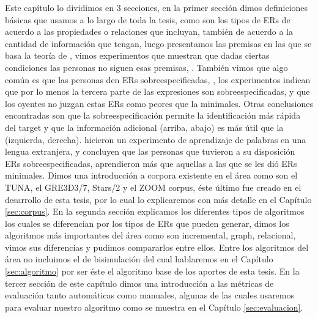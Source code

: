 Este cap\'itulo lo dividimos en 3 secciones, en la primer secci\'on dimos definiciones b\'asicas que usamos a lo largo de toda la tesis, 
como son los tipos de ERs de acuerdo a las propiedades o relaciones que incluyan, tambi\'en de acuerdo a la cantidad de informaci\'on que 
tengan, luego presentamos las premisas en las que se basa la teor\'ia de \cite{clark1992arenas,clark96,Clark-Marshall81}, vimos experimentos que muestran que dadas ciertas condiciones las personas no siguen esas premisas, 
\cite{keysar:Curr98}. Tambi\'en vimos que algo com\'un es que las personas den ERs sobreespecificadas, \cite{arts,Engelhardt_Bailey_Ferreira_2006}, los experimentos 
indican que por lo menos la tercera parte de las expresiones son sobreespecificadas, y que los oyentes no juzgan estas ERs como peores que 
la minimales. Otras conclusiones encontradas son que la sobreespecificaci\'on permite la identificaci\'on m\'as r\'apida del target y que la 
informaci\'on adicional (arriba, abajo) es m\'as \'util que la (izquierda, derecha). \cite{Lu_sasha2015} hicieron un experimento de 
aprendizaje de palabras en una lengua extranjera, y concluyen que las personas que tuvieron a su disposici\'on ERs sobreespecificadas, 
aprendieron m\'as que aquellas a las que se les di\'o ERs minimales. Dimos una introducci\'on a corpora existente en el \'area 
como son el TUNA, el GRE3D3/7, Stars/2 y el ZOOM corpus, \'este \'ultimo fue creado en el desarrollo de esta tesis, por lo cual lo explicaremos con m\'as detalle en el Cap\'itulo \ref{sec:corpus}. En la segunda secci\'on explicamos los diferentes tipos de algoritmos los cuales se 
diferencian por los tipos de ERs que pueden generar, dimos los algoritmos m\'as importantes del \'area como son incremental, graph, relacional, vimos sus diferencias y pudimos compararlos entre ellos. Entre los algoritmos del \'area no incluimos el de 
bisimulaci\'on del cual hablaremos en el Cap\'itulo \ref{sec:algoritmo} por ser \'este el algoritmo base de los aportes de esta tesis. En la tercer secci\'on de este cap\'itulo dimos una introducci\'on a las m\'etricas de evaluaci\'on tanto autom\'aticas como manuales, algunas de las cuales usaremos para evaluar nuestro algoritmo como se muestra en el Cap\'itulo \ref{sec:evaluacion}.

